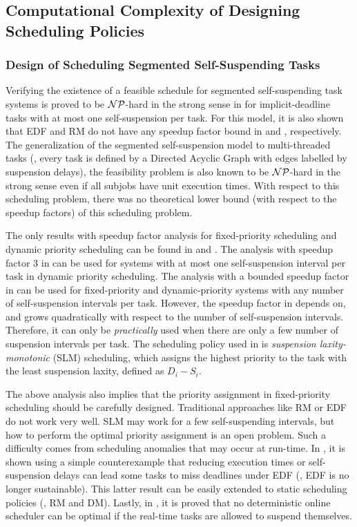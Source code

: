 \subsection{Computational Complexity of Designing Scheduling Policies}

\subsubsection{Design of Scheduling Segmented Self-Suspending Tasks}
Verifying the existence of a feasible schedule for segmented self-suspending task systems is proved to be ${\cal NP}$-hard in the strong sense in \cite{Ridouard_2004} for implicit-deadline tasks with at most one self-suspension per task. For this model, it is also shown that EDF and RM do not have any speedup factor bound in \cite{Ridouard_2004} and \cite{RTSS-ChenL14}, respectively. The generalization of the segmented self-suspension model to multi-threaded tasks (\ie, every task is defined by a Directed Acyclic Graph with edges labelled by suspension delays), the feasibility problem is also known to be  ${\cal NP}$-hard in the strong sense  \cite{Ric03} even if all subjobs have unit execution times. With respect to this scheduling problem, there was no theoretical lower bound (with respect to the speedup factors) of this scheduling problem. 

 The only results with speedup factor analysis for fixed-priority scheduling and dynamic priority scheduling can be found in \cite{RTSS-ChenL14} and \cite{WC16-suspend-DATE}. The analysis with speedup factor $3$ in \cite{RTSS-ChenL14} can be used for systems with at most one self-suspension interval per task in dynamic priority scheduling. The analysis with a bounded speedup factor in \cite{WC16-suspend-DATE} can be used for fixed-priority and dynamic-priority systems with any number of self-suspension intervals per task. However, the speedup factor in \cite{WC16-suspend-DATE} depends on, and grows quadratically with respect to the number of self-suspension intervals. Therefore, it can only be \emph{practically} used when there are only a few number of suspension intervals per task. The scheduling policy used in \cite{WC16-suspend-DATE} is \emph{suspension laxity-monotonic} (SLM) scheduling, which assigns the highest priority to the task with the least suspension laxity, defined as $D_i-S_i$.


The above analysis also implies that the priority assignment in fixed-priority scheduling should be carefully designed. Traditional approaches like RM or EDF do not work very well. SLM may work for a few self-suspending intervals, but how to perform the optimal priority assignment is an open problem. Such a difficulty comes from scheduling anomalies that may occur at run-time. In \cite{Ridouard_2004}, it is shown using a simple counterexample that reducing execution times or self-suspension delays can lead some tasks to miss deadlines under EDF (\ie, EDF is no longer sustainable). This latter result can be easily extended to static scheduling policies (\ie, RM and DM). Lastly, in \cite{RidouardR06}, it is proved that no deterministic online scheduler can be optimal if the real-time tasks are allowed to suspend themselves.



